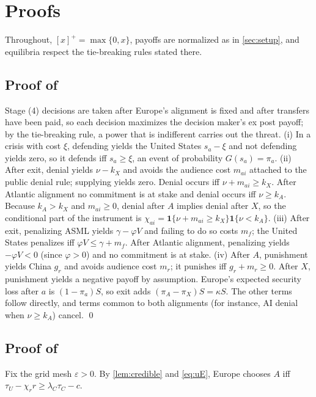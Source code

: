 \section{Proofs}\label{app:proofs}

Throughout, $[x]^+ = \max\{0,x\}$, payoffs are normalized as in \cref{sec:setup}, and equilibria respect the tie-breaking rules stated there.

\subsection*{Proof of }

Stage (4) decisions are taken after Europe's alignment is fixed and after transfers have been paid, so each decision maximizes the decision maker's ex post payoff; by the tie-breaking rule, a power that is indifferent carries out the threat.
(i) In a crisis with cost $\xi$, defending yields the United States $s_a - \xi$ and not defending yields zero, so it defends iff $s_a \geq \xi$, an event of probability $G(s_a)=\pi_a$.
(ii) After exit, denial yields $\nu - k_X$ and avoids the audience cost $m_{ai}$ attached to the public denial rule; supplying yields zero. Denial occurs iff $\nu + m_{ai} \geq k_X$. After Atlantic alignment no commitment is at stake and denial occurs iff $\nu \geq k_A$. Because $k_A>k_X$ and $m_{ai}\geq 0$, denial after $A$ implies denial after $X$, so the conditional part of the instrument is $\chi_{ai} = \mathbf{1}\{\nu+m_{ai}\geq k_X\}\mathbf{1}\{\nu<k_A\}$.
(iii) After exit, penalizing ASML yields $\gamma - \varphi V$ and failing to do so costs $m_f$; the United States penalizes iff $\varphi V \leq \gamma + m_f$. After Atlantic alignment, penalizing yields $-\varphi V<0$ (since $\varphi>0$) and no commitment is at stake.
(iv) After $A$, punishment yields China $g_r$ and avoids audience cost $m_r$; it punishes iff $g_r + m_r\geq 0$. After $X$, punishment yields a negative payoff by assumption.
Europe's expected security loss after $a$ is $(1-\pi_a)S$, so exit adds $(\pi_A - \pi_X)S = \kappa S$. The other terms follow directly, and terms common to both alignments (for instance, AI denial when $\nu\geq k_A$) cancel. \qed

\subsection*{Proof of }

Fix the grid mesh $\varepsilon>0$. By \cref{lem:credible} and \cref{eq:uE}, Europe chooses $A$ iff $\tau_U - \chi_r r \geq \lambda_C\tau_C - c$.

